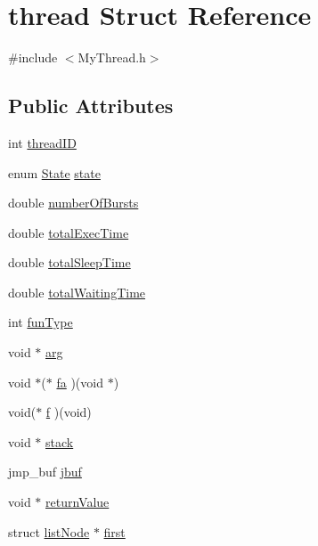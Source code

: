 \hypertarget{structthread}{\section{thread Struct Reference}
\label{structthread}
}


{\ttfamily \#include $<$My\+Thread.\+h$>$}

\subsection*{Public Attributes}
\begin{DoxyCompactItemize}
\item 
int \hyperlink{structthread_a1bd7dbc907bd42ad24b2ca7684374e0c}{thread\+I\+D}
\item 
enum \hyperlink{_my_thread_8h_a5d74787dedbc4e11c1ab15bf487e61f8}{State} \hyperlink{structthread_aafc49c5d0093246aabe04c0fbe7bc501}{state}
\item 
double \hyperlink{structthread_abe99980c7f19d46445b81fc112773181}{number\+Of\+Bursts}
\item 
double \hyperlink{structthread_a17b4aa92faed7890a53b692f90e55513}{total\+Exec\+Time}
\item 
double \hyperlink{structthread_aa57b83b2e1fe65e7772195eb8d7c733c}{total\+Sleep\+Time}
\item 
double \hyperlink{structthread_a35cc2bd19d37b55d551b7e1b3a184fae}{total\+Waiting\+Time}
\item 
int \hyperlink{structthread_a5f7295a3b573a531fc61af5e92fbf899}{fun\+Type}
\item 
void $\ast$ \hyperlink{structthread_a7b848d8a51a51c7c499c4bd2caa78019}{arg}
\item 
void $\ast$($\ast$ \hyperlink{structthread_afd0af41c9ba85bd94ef987b929d92476}{fa} )(void $\ast$)
\item 
void($\ast$ \hyperlink{structthread_a5599cb1af1d8c28fe2b3ca909fc25423}{f} )(void)
\item 
void $\ast$ \hyperlink{structthread_a33ed512db812fe3068bd059c00ea9c29}{stack}
\item 
jmp\+\_\+buf \hyperlink{structthread_a4b52487c0bc57b89ebc094c0ed76932c}{jbuf}
\item 
void $\ast$ \hyperlink{structthread_a92a58cc20d419199ed0bffb50518e4f0}{return\+Value}
\item 
struct \hyperlink{structlist_node}{list\+Node} $\ast$ \hyperlink{structthread_ae831c71a3ca32deabbb8868b6c5b6966}{first}
\end{DoxyCompactItemize}


